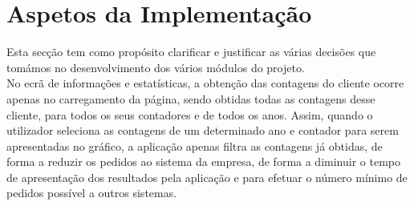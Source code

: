 \chapter{Aspetos da Implementação} \label{cap:implementacao}
Esta secção tem como propósito clarificar e justificar as várias decisões que tomámos no desenvolvimento dos vários módulos do projeto. \\


No ecrã de informações e estatísticas, a obtenção das contagens do cliente ocorre apenas no carregamento da página, sendo obtidas todas as contagens desse cliente, para todos os seus contadores e de todos os anos. Assim, quando o utilizador seleciona as contagens de um determinado ano e contador para serem apresentadas no gráfico, a aplicação apenas filtra as contagens já obtidas, de forma a reduzir os pedidos ao sistema da empresa, de forma a diminuir o tempo de apresentação dos resultados pela aplicação e para efetuar o número mínimo de pedidos possível a outros sistemas.












